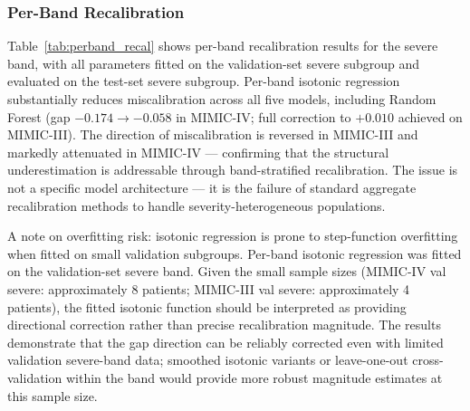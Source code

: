 \documentclass{ieeeaccess}
\begin{document}
\subsubsection{Per-Band Recalibration}

Table~\ref{tab:perband_recal} shows per-band recalibration results for the severe band, with all parameters fitted on the validation-set severe subgroup and evaluated on the test-set severe subgroup. Per-band isotonic regression substantially reduces miscalibration across all five models, including Random Forest (gap $-0.174 \rightarrow -0.058$ in MIMIC-IV; full correction to $+0.010$ achieved on MIMIC-III). The direction of miscalibration is reversed in MIMIC-III and markedly attenuated in MIMIC-IV — confirming that the structural underestimation is addressable through band-stratified recalibration. The issue is not a specific model architecture — it is the failure of standard aggregate recalibration methods to handle severity-heterogeneous populations.

A note on overfitting risk: isotonic regression is prone to step-function overfitting when fitted on small validation subgroups. Per-band isotonic regression was fitted on the validation-set severe band. Given the small sample sizes (MIMIC-IV val severe: approximately 8 patients; MIMIC-III val severe: approximately 4 patients), the fitted isotonic function should be interpreted as providing directional correction rather than precise recalibration magnitude. The results demonstrate that the gap direction can be reliably corrected even with limited validation severe-band data; smoothed isotonic variants or leave-one-out cross-validation within the band would provide more robust magnitude estimates at this sample size.
\end{document}
